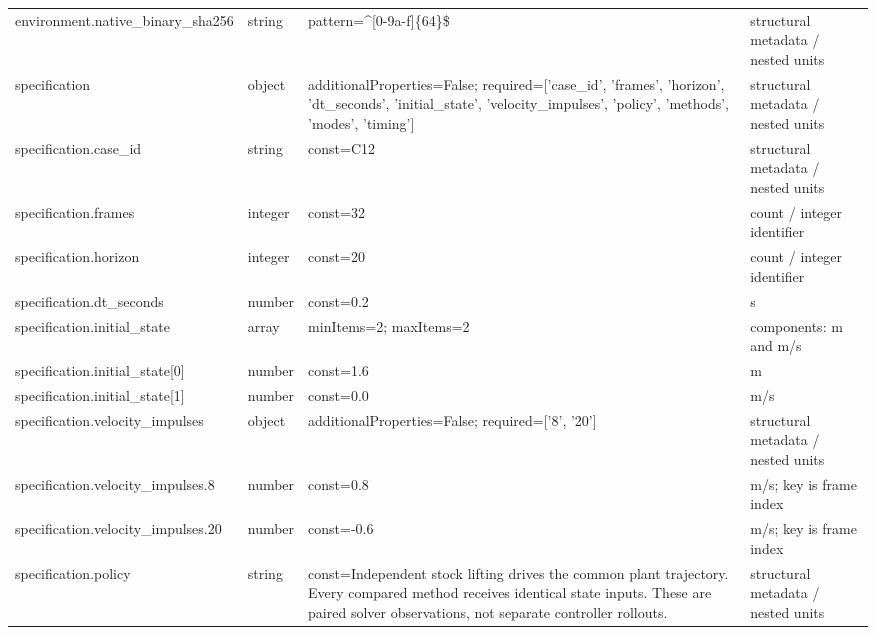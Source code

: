 \begin{longtable}{@{}>{\raggedright\arraybackslash}p{}>{\raggedright\arraybackslash}p{}>{\raggedright\arraybackslash}p{}>{\raggedright\arraybackslash}p{}@{}}
environment.\allowbreak{}native\_\allowbreak{}binary\_\allowbreak{}sha256 & string & pattern=\allowbreak{}\textasciicircum{}[0-9a-\allowbreak{}f]\{64\}\$ & structural metadata /\allowbreak{} nested units\\
specification & object & additionalProperties=\allowbreak{}False; required=\allowbreak{}['case\_\allowbreak{}id', 'frames', 'horizon', 'dt\_\allowbreak{}seconds', 'initial\_\allowbreak{}state', 'velocity\_\allowbreak{}impulses', 'policy', 'methods', 'modes', 'timing'] & structural metadata /\allowbreak{} nested units\\
specification.\allowbreak{}case\_\allowbreak{}id & string & const=\allowbreak{}C12 & structural metadata /\allowbreak{} nested units\\
specification.\allowbreak{}frames & integer & const=\allowbreak{}32 & count /\allowbreak{} integer identifier\\
specification.\allowbreak{}horizon & integer & const=\allowbreak{}20 & count /\allowbreak{} integer identifier\\
specification.\allowbreak{}dt\_\allowbreak{}seconds & number & const=\allowbreak{}0.\allowbreak{}2 & s\\
specification.\allowbreak{}initial\_\allowbreak{}state & array & minItems=\allowbreak{}2; maxItems=\allowbreak{}2 & components: m and m/\allowbreak{}s\\
specification.\allowbreak{}initial\_\allowbreak{}state[0] & number & const=\allowbreak{}1.\allowbreak{}6 & m\\
specification.\allowbreak{}initial\_\allowbreak{}state[1] & number & const=\allowbreak{}0.\allowbreak{}0 & m/\allowbreak{}s\\
specification.\allowbreak{}velocity\_\allowbreak{}impulses & object & additionalProperties=\allowbreak{}False; required=\allowbreak{}['8', '20'] & structural metadata /\allowbreak{} nested units\\
specification.\allowbreak{}velocity\_\allowbreak{}impulses.\allowbreak{}8 & number & const=\allowbreak{}0.\allowbreak{}8 & m/\allowbreak{}s; key is frame index\\
specification.\allowbreak{}velocity\_\allowbreak{}impulses.\allowbreak{}20 & number & const=\allowbreak{}-0.\allowbreak{}6 & m/\allowbreak{}s; key is frame index\\
specification.\allowbreak{}policy & string & const=\allowbreak{}Independent stock lifting drives the common plant trajectory.\allowbreak{} Every compared method receives identical state inputs.\allowbreak{} These are paired solver observations, not separate controller rollouts.\allowbreak{} & structural metadata /\allowbreak{} nested units\\

\end{longtable}
